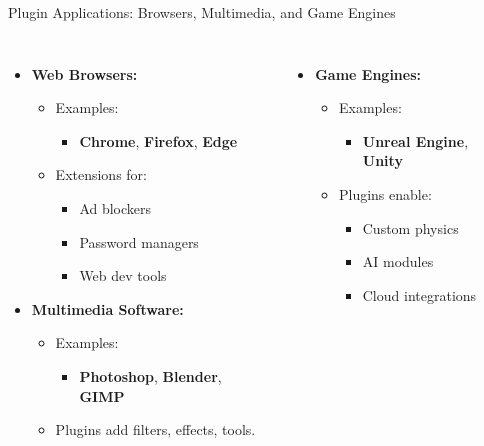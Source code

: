 \documentclass[aspectratio=169, table]{beamer}
\begin{document}
\begin{frame}{\Large{Plugin Applications: Browsers, Multimedia, and Game Engines}}

\begin{columns}
\begin{itemize}
	\item \textbf{Web Browsers:}
	\begin{itemize}
		\item Examples:
		\begin{itemize}
			\item \textbf{Chrome}, \textbf{Firefox}, \textbf{Edge}
		\end{itemize}
		\item Extensions for:
		\begin{itemize}
			\item Ad blockers
			\item Password managers
			\item Web dev tools
		\end{itemize}
	\end{itemize}
	
	\item \textbf{Multimedia Software:}
	\begin{itemize}
		\item Examples:
		\begin{itemize}
			\item \textbf{Photoshop}, \textbf{Blender}, \textbf{GIMP}
		\end{itemize}
		\item Plugins add filters, effects, tools.
	\end{itemize}
\end{itemize}
\begin{itemize}
	\item \textbf{Game Engines:}
	\begin{itemize}
		\item Examples:
		\begin{itemize}
			\item \textbf{Unreal Engine}, \textbf{Unity}
		\end{itemize}
		\item Plugins enable:
		\begin{itemize}
			\item Custom physics
			\item AI modules
			\item Cloud integrations
		\end{itemize}
	\end{itemize}
\end{itemize}
\end{columns}
\end{frame}
\end{document}
